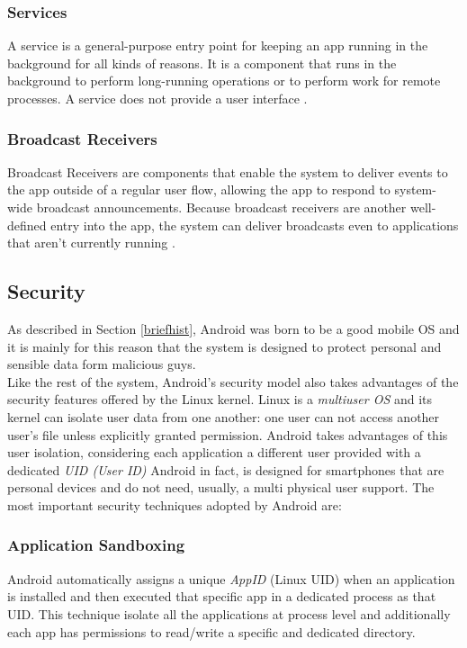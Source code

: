 \subsubsection{Services} A service is a general-purpose entry point for keeping an app running in the background for all kinds of reasons. It is a component that runs in the background to perform long-running operations or to perform work for remote processes. A service does not provide a user interface \cite{devandroifundamentals}. 

\subsubsection{Broadcast Receivers} Broadcast Receivers are components that enable the system to deliver events to the app outside of a regular user flow, allowing the app to respond to system-wide broadcast announcements. Because broadcast receivers are another well-defined entry into the app, the system can deliver broadcasts even to applications that aren't currently running \cite{devandroifundamentals}.

\subsection{Security}\label{androidsecurity}
\par
As described in Section \ref{briefhist}, Android was born to be a good mobile OS and it is mainly for this reason that the system is designed to protect personal and sensible data form malicious guys.\\
Like the rest of the system, Android's security model also takes advantages of the security features offered by the Linux kernel. Linux is a \textit{multiuser OS} and its kernel can isolate user data from one another: one user can not access another user's file unless explicitly granted permission. Android takes advantages of this user isolation, considering each application a different user provided with a dedicated \textit{UID (User ID)} \cite{elenkov2014android} Android in fact, is designed for smartphones that are personal devices and do not need, usually, a multi physical user support.
The most important security techniques adopted by Android are:

	\subsubsection{Application Sandboxing} Android automatically assigns a unique \textit{AppID} (Linux UID) when an application is installed and then executed that specific app in a dedicated process as that UID. This technique isolate all the applications at process level and additionally each app has permissions to read/write a specific and dedicated directory.
	
